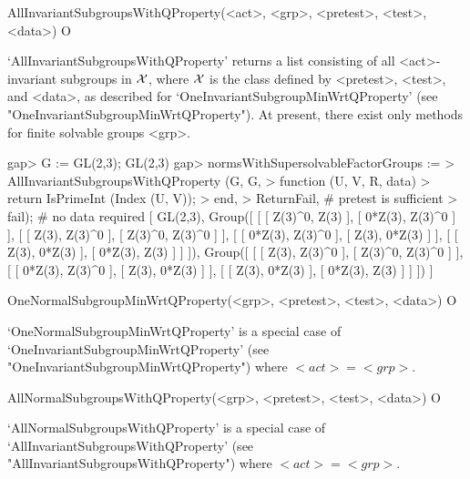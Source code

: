\>AllInvariantSubgroupsWithQProperty(<act>, <grp>, <pretest>, <test>, <data>) O

`AllInvariantSubgroupsWithQProperty' returns a list consisting of all 
<act>-invariant subgroups in $\cal X$, where $\cal X$ is the class defined by <pretest>,
<test>, and <data>, as described for `OneInvariantSubgroupMinWrtQProperty' (see
"OneInvariantSubgroupMinWrtQProperty"). 
At present, there exist only methods for finite solvable groups <grp>.

\beginexample
gap> G := GL(2,3);
GL(2,3)
gap> normsWithSupersolvableFactorGroups :=
> AllInvariantSubgroupsWithQProperty (G, G, 
>    function (U, V, R, data)
>       return IsPrimeInt (Index (U, V));
>    end,
>    ReturnFail, # pretest is sufficient
>    fail); # no data required
[ GL(2,3), 
  Group([ [ [ Z(3)^0, Z(3) ], [ 0*Z(3), Z(3)^0 ] ], [ [ Z(3), Z(3)^0 ], 
          [ Z(3)^0, Z(3)^0 ] ], [ [ 0*Z(3), Z(3)^0 ], [ Z(3), 0*Z(3) ] ], 
      [ [ Z(3), 0*Z(3) ], [ 0*Z(3), Z(3) ] ] ]), 
  Group([ [ [ Z(3), Z(3)^0 ], [ Z(3)^0, Z(3)^0 ] ], 
      [ [ 0*Z(3), Z(3)^0 ], [ Z(3), 0*Z(3) ] ], 
      [ [ Z(3), 0*Z(3) ], [ 0*Z(3), Z(3) ] ] ]) ]
\endexample


\>OneNormalSubgroupMinWrtQProperty(<grp>, <pretest>, <test>, <data>) O

`OneNormalSubgroupMinWrtQProperty' is a special case of 
`OneInvariantSubgroupMinWrtQProperty' (see
"OneInvariantSubgroupMinWrtQProperty") where $<act> = <grp>$. 

\>AllNormalSubgroupsWithQProperty(<grp>, <pretest>, <test>, <data>) O

`AllNormalSubgroupsWithQProperty' is a special case of 
`AllInvariantSubgroupsWithQProperty' (see
"AllInvariantSubgroupsWithQProperty") where $<act> = <grp>$. 


